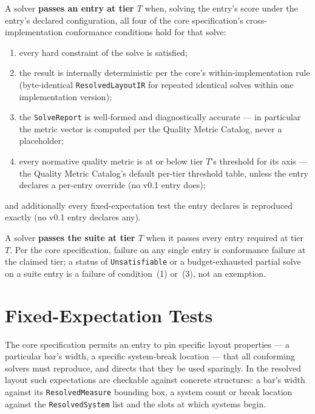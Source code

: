 \documentclass[11pt,letterpaper]{report}
\newcounter{requirement}[chapter]
\begin{document}
\begin{requirement}
\label{req:refsuite:pass}
A solver \textbf{passes an entry at tier $T$} when, solving the entry's
score under the entry's declared configuration, all four of the core
specification's cross-implementation conformance conditions hold for that
solve:

\begin{enumerate}
  \item every hard constraint of the solve is satisfied;
  \item the result is internally deterministic per the core's
    within-implementation rule (byte-identical
    \texttt{ResolvedLayoutIR} for repeated identical solves within one
    implementation version);
  \item the \texttt{SolveReport} is well-formed and diagnostically
    accurate --- in particular the metric vector is computed per the
    Quality Metric Catalog, never a placeholder;
  \item every normative quality metric is at or below tier $T$'s
    threshold for its axis --- the Quality Metric Catalog's default
    per-tier threshold table, unless the entry declares a per-entry
    override (no v0.1 entry does);
\end{enumerate}

and additionally every fixed-expectation test the entry declares is
reproduced exactly (no v0.1 entry declares any).

A solver \textbf{passes the suite at tier $T$} when it passes every entry
required at tier $T$. Per the core specification, failure on any single
entry is conformance failure at the claimed tier; a status of
\texttt{Unsatisfiable} or a budget-exhausted partial solve on a suite
entry is a failure of condition~(1) or~(3), not an exemption.
\end{requirement}

\section{Fixed-Expectation Tests}
\label{sec:model:fixed}

The core specification permits an entry to pin specific layout properties
--- a particular bar's width, a specific system-break location --- that all
conforming solvers must reproduce, and directs that they be used
sparingly. In the resolved layout such expectations are checkable against
concrete structures: a bar's width against its \texttt{ResolvedMeasure}
bounding box, a system count or break location against the
\texttt{ResolvedSystem} list and the slots at which systems begin.
\end{document}
